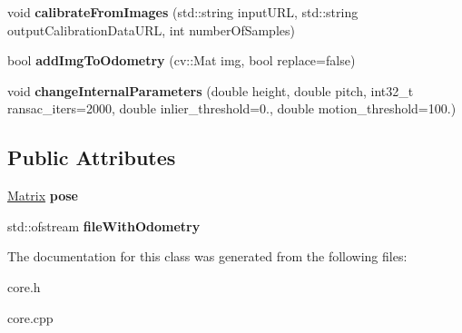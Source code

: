 \begin{DoxyCompactItemize}
\item 
\hypertarget{class_core_abd99ed632c6542120bbeb11c838a7241}{void {\bfseries calibrate\+From\+Images} (std\+::string input\+U\+R\+L, std\+::string output\+Calibration\+Data\+U\+R\+L, int number\+Of\+Samples)}\label{class_core_abd99ed632c6542120bbeb11c838a7241}

\item 
\hypertarget{class_core_ae0bac916aea073639aa489a90b0ee1a8}{bool {\bfseries add\+Img\+To\+Odometry} (cv\+::\+Mat img, bool replace=false)}\label{class_core_ae0bac916aea073639aa489a90b0ee1a8}

\item 
\hypertarget{class_core_aaf27bf93cc786e55d75f707a0ed12e7a}{void {\bfseries change\+Internal\+Parameters} (double height, double pitch, int32\+\_\+t ransac\+\_\+iters=2000, double inlier\+\_\+threshold=0., double motion\+\_\+threshold=100.)}\label{class_core_aaf27bf93cc786e55d75f707a0ed12e7a}

\end{DoxyCompactItemize}
\subsection*{Public Attributes}
\begin{DoxyCompactItemize}
\item 
\hypertarget{class_core_afe21d28d57138d29b65742dc8417c4bd}{\hyperlink{class_matrix}{Matrix} {\bfseries pose}}\label{class_core_afe21d28d57138d29b65742dc8417c4bd}

\item 
\hypertarget{class_core_a53fe27e8a8f5e35ec9f37c0314f87854}{std\+::ofstream {\bfseries file\+With\+Odometry}}\label{class_core_a53fe27e8a8f5e35ec9f37c0314f87854}

\end{DoxyCompactItemize}


The documentation for this class was generated from the following files\+:\begin{DoxyCompactItemize}
\item 
core.\+h\item 
core.\+cpp\end{DoxyCompactItemize}
